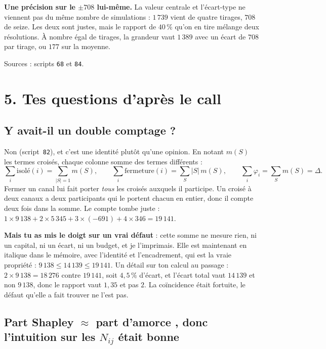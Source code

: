 \documentclass[11pt,a4paper]{article}
\begin{document}
\textbf{Une précision sur le $\pm 708$ lui-même.} La valeur centrale et l'écart-type ne viennent
pas du même nombre de simulations : $1\,739$ vient de quatre tirages, $708$ de seize. Les deux
sont justes, mais le rapport de $40\,\%$ qu'on en tire mélange deux résolutions. À nombre égal de
tirages, la grandeur vaut $1\,389$ avec un écart de $708$ par tirage, ou $177$ sur la moyenne.

\medskip
{\small Sources : scripts \texttt{68} et \texttt{84}.}

\section*{5. Tes questions d'après le call}

\subsection*{Y avait-il un double comptage ?}

Non (script~\texttt{82}), et c'est une identité plutôt qu'une opinion. En notant $m(S)$ les termes
croisés, chaque colonne somme des termes différents :
\[
  \textstyle\sum_i \text{isolé}(i) = \sum_{|S|=1} m(S), \qquad
  \sum_i \text{fermeture}(i) = \sum_S |S|\,m(S), \qquad
  \sum_i \varphi_i = \sum_S m(S) = \Delta .
\]
Fermer un canal lui fait porter \emph{tous} les croisés auxquels il participe. Un croisé à deux
canaux a deux participants qui le portent chacun en entier, donc il compte deux fois dans la
somme. Le compte tombe juste :
$1 \times 9\,138 + 2 \times 5\,345 + 3 \times (-691) + 4 \times 346 = 19\,141$.

\textbf{Mais tu as mis le doigt sur un vrai défaut} : cette somme ne mesure rien, ni un capital,
ni un écart, ni un budget, et je l'imprimais. Elle est maintenant en italique dans le mémoire,
avec l'identité et l'encadrement, qui est la vraie propriété :
$9\,138 \leq 14\,139 \leq 19\,141$. Un détail sur ton calcul au passage :
$2 \times 9\,138 = 18\,276$ contre $19\,141$, soit $4{,}5\,\%$ d'écart, et l'écart total vaut
$14\,139$ et non $9\,138$, donc le rapport vaut $1{,}35$ et pas $2$. La coïncidence était
fortuite, le défaut qu'elle a fait trouver ne l'est pas.

\subsection*{\og Part Shapley $\approx$ part d'amorce \fg, donc l'intuition sur les $N_{ij}$ était bonne}
\end{document}
